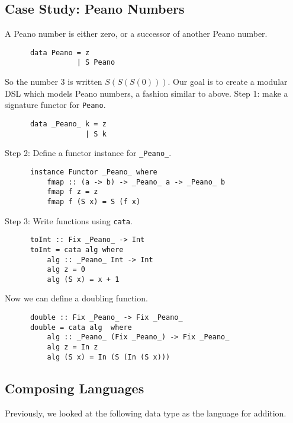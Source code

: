 \documentclass[a4paper,12pt]{article}
\theoremstyle{remark}
\begin{document}
  \subsection{Case Study: Peano Numbers}

  A Peano number is either zero, or a successor of another Peano number.

  \begin{lstlisting}
      data Peano = z
                 | S Peano  \end{lstlisting}

  So the number 3 is written $S(S(S (0)))$. Our goal is to create a
  modular DSL which models Peano numbers, a fashion similar to above.
  Step 1: make a signature functor for \lstinline{Peano}.

  \begin{lstlisting}
      data _Peano_ k = z
                   | S k  \end{lstlisting}

  Step 2: Define a functor instance for \lstinline{_Peano_}.

  \begin{lstlisting}
      instance Functor _Peano_ where
          fmap :: (a -> b) -> _Peano_ a -> _Peano_ b
          fmap f z = z
          fmap f (S x) = S (f x)  \end{lstlisting}

  Step 3: Write functions using \lstinline{cata}.

  \begin{lstlisting}
      toInt :: Fix _Peano_ -> Int
      toInt = cata alg where
          alg :: _Peano_ Int -> Int
          alg z = 0
          alg (S x) = x + 1  \end{lstlisting}

  Now we can define a doubling function.

  \begin{lstlisting}
      double :: Fix _Peano_ -> Fix _Peano_
      double = cata alg  where
          alg :: _Peano_ (Fix _Peano_) -> Fix _Peano_
          alg z = In z
          alg (S x) = In (S (In (S x)))  \end{lstlisting}

  \subsection{Composing Languages}

  Previously, we looked at the following data type as the language for addition.
\end{document}
